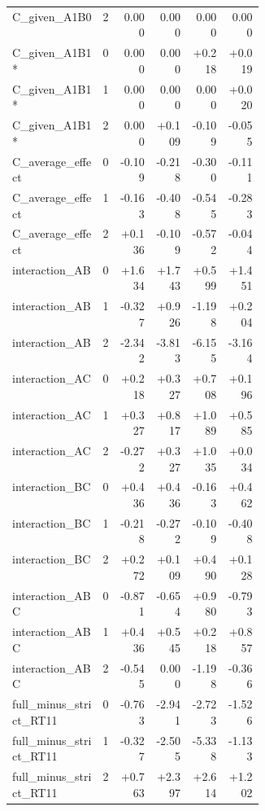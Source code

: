 \begin{longtable}{@{}p{0.36\linewidth}rrrrr@{}}
C\_\allowbreak{}given\_\allowbreak{}A1B0 & 2 & 0.000 & 0.000 & 0.000 & 0.000 \\
C\_\allowbreak{}given\_\allowbreak{}A1B1* & 0 & 0.000 & 0.000 & +0.218 & +0.019 \\
C\_\allowbreak{}given\_\allowbreak{}A1B1* & 1 & 0.000 & 0.000 & 0.000 & +0.020 \\
C\_\allowbreak{}given\_\allowbreak{}A1B1* & 2 & 0.000 & +0.109 & -0.109 & -0.055 \\
C\_\allowbreak{}average\_\allowbreak{}effect & 0 & -0.109 & -0.218 & -0.300 & -0.111 \\
C\_\allowbreak{}average\_\allowbreak{}effect & 1 & -0.163 & -0.408 & -0.545 & -0.283 \\
C\_\allowbreak{}average\_\allowbreak{}effect & 2 & +0.136 & -0.109 & -0.572 & -0.044 \\
interaction\_\allowbreak{}AB & 0 & +1.634 & +1.743 & +0.599 & +1.451 \\
interaction\_\allowbreak{}AB & 1 & -0.327 & +0.926 & -1.198 & +0.204 \\
interaction\_\allowbreak{}AB & 2 & -2.342 & -3.813 & -6.155 & -3.164 \\
interaction\_\allowbreak{}AC & 0 & +0.218 & +0.327 & +0.708 & +0.196 \\
interaction\_\allowbreak{}AC & 1 & +0.327 & +0.817 & +1.089 & +0.585 \\
interaction\_\allowbreak{}AC & 2 & -0.272 & +0.327 & +1.035 & +0.034 \\
interaction\_\allowbreak{}BC & 0 & +0.436 & +0.436 & -0.163 & +0.462 \\
interaction\_\allowbreak{}BC & 1 & -0.218 & -0.272 & -0.109 & -0.408 \\
interaction\_\allowbreak{}BC & 2 & +0.272 & +0.109 & +0.490 & +0.128 \\
interaction\_\allowbreak{}ABC & 0 & -0.871 & -0.654 & +0.980 & -0.793 \\
interaction\_\allowbreak{}ABC & 1 & +0.436 & +0.545 & +0.218 & +0.857 \\
interaction\_\allowbreak{}ABC & 2 & -0.545 & 0.000 & -1.198 & -0.366 \\
full\_\allowbreak{}minus\_\allowbreak{}strict\_\allowbreak{}RT11 & 0 & -0.763 & -2.941 & -2.723 & -1.526 \\
full\_\allowbreak{}minus\_\allowbreak{}strict\_\allowbreak{}RT11 & 1 & -0.327 & -2.505 & -5.338 & -1.133 \\
full\_\allowbreak{}minus\_\allowbreak{}strict\_\allowbreak{}RT11 & 2 & +0.763 & +2.397 & +2.614 & +1.202 \\

\end{longtable}
